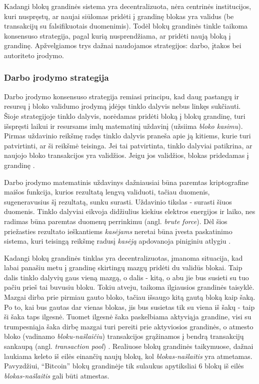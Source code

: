 Kadangi blokų grandinės sistema yra decentralizuota, nėra centrinės institucijos, kuri nuspręstų, ar naujai siūlomas pridėti į grandinę blokas
yra validus (be transakcijų su falsifikuotais duomenimis). Todėl blokų grandinės tinkle taikoma konsensuso strategija,
pagal kurią nusprendžiama, ar pridėti naują bloką į grandinę. Apžvelgiamos trys dažnai naudojamos strategijos: darbo, įtakos bei autoriteto įrodymo.

\subsubsection{Darbo įrodymo strategija}

Darbo įrodymo konsensuso strategija remiasi principu, kad daug pastangų ir resursų į bloko validumo įrodymą įdėjęs tinklo
dalyvis nebus linkęs sukčiauti. Šioje strategijoje tinklo dalyvis, norėdamas pridėti bloką į blokų grandinę, turi išspręsti laikui ir resursams
imlų matematinį
uždavinį (užsiima \textit{bloko kasimu}). Pirmas uždavinio reikšmę radęs tinklo dalyvis praneša apie ją kitiems, kurie turi patvirtinti,
ar ši reikšmė teisinga. Jei tai patvirtinta, tinklo dalyviai patikrina, ar naujojo bloko transakcijos yra validžios. Jeigu jos validžios,
blokas pridedamas į grandinę \cite{Zheng2017}.

Darbo įrodymo matematinis uždavinys dažniausiai būna paremtas kriptografine maišos funkcija, kurios rezultatą lengvą validuoti,
tačiau duomenis, sugeneravusius šį rezultatą, sunku surasti. Uždavinio tikslas - surasti šiuos duomenis. Tinklo dalyviai eikvoja didžiulius
kiekius elektros energijos ir laiko,
nes radimas būna paremtas duomenų perrinkimu (angl. \textit{brute force}). Dėl šios priežasties rezultato ieškantiems \textit{kasėjams}
 neretai būna įvesta paskatinimo sistema, kuri teisingą reikšmę radusį
\textit{kasėją} apdovanoja piniginiu atlygiu \cite{SatoshiNakamoto}. 

Kadangi blokų grandinės tinklas yra decentralizuotas, įmanoma situacija, kad labai panašiu metu į grandinę skirtingų mazgų pridėti du validūs blokai.
Taip dalis tinklo dalyvių gaus vieną mazgą, o dalis - kitą, o abu jie bus susieti su tuo pačiu prieš tai buvusiu bloku.
Tokiu atveju, taikoma ilgiausios grandinės taisyklė. Mazgai dirba prie pirmiau gauto bloko,
tačiau išsaugo kitą gautą bloką kaip šaką. Po to, kai bus gautas dar vienas blokas, jis bus susietas tik su viena iš šakų - taip ši šaka taps ilgesnė. Tuomet
ilgesnė šaka paskelbiama aktyviąja grandine, visi su trumpesniąja šaka dirbę mazgai turi pereiti prie aktyviosios grandinės, o atmesto bloko (vadinamo \textit{bloku-našlaičiu}) transakcijos
grąžinamos į bendrą transakcijų sankaupą (angl. \textit{transaction pool}) \cite{SatoshiNakamoto}.
Realiuose blokų grandinės taikymuose, dažnai laukiama keleto iš eilės einančių naujų blokų, kol \textit{blokas-našlaitis}
yra atmetamas. Pavyzdžiui,
\enquote{Bitcoin} blokų grandinėje tik sulaukus apytiksliai 6 blokų iš eilės \textit{blokas-našlaitis} gali būti atmestas\cite{Zheng2017}.

